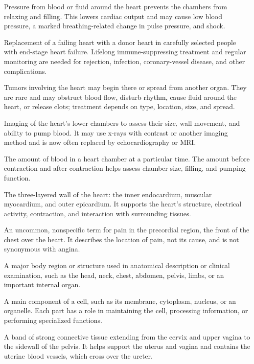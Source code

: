  Pressure from blood or fluid around the heart prevents the chambers from relaxing and filling. This lowers cardiac output and may cause low blood pressure, a marked breathing-related change in pulse pressure, and shock.

 Replacement of a failing heart with a donor heart in carefully selected people with end-stage heart failure. Lifelong immune-suppressing treatment and regular monitoring are needed for rejection, infection, coronary-vessel disease, and other complications.

 Tumors involving the heart may begin there or spread from another organ. They are rare and may obstruct blood flow, disturb rhythm, cause fluid around the heart, or release clots; treatment depends on type, location, size, and spread.

 Imaging of the heart's lower chambers to assess their size, wall movement, and ability to pump blood. It may use x-rays with contrast or another imaging method and is now often replaced by echocardiography or MRI.

 The amount of blood in a heart chamber at a particular time. The amount before contraction and after contraction helps assess chamber size, filling, and pumping function.

 The three-layered wall of the heart: the inner endocardium, muscular myocardium, and outer epicardium. It supports the heart's structure, electrical activity, contraction, and interaction with surrounding tissues.

 An uncommon, nonspecific term for pain in the precordial region, the front of the chest over the heart. It describes the location of pain, not its cause, and is not synonymous with angina.

 A major body region or structure used in anatomical description or clinical examination, such as the head, neck, chest, abdomen, pelvis, limbs, or an important internal organ.

 A main component of a cell, such as its membrane, cytoplasm, nucleus, or an organelle. Each part has a role in maintaining the cell, processing information, or performing specialized functions.

 A band of strong connective tissue extending from the cervix and upper vagina to the sidewall of the pelvis. It helps support the uterus and vagina and contains the uterine blood vessels, which cross over the ureter.

